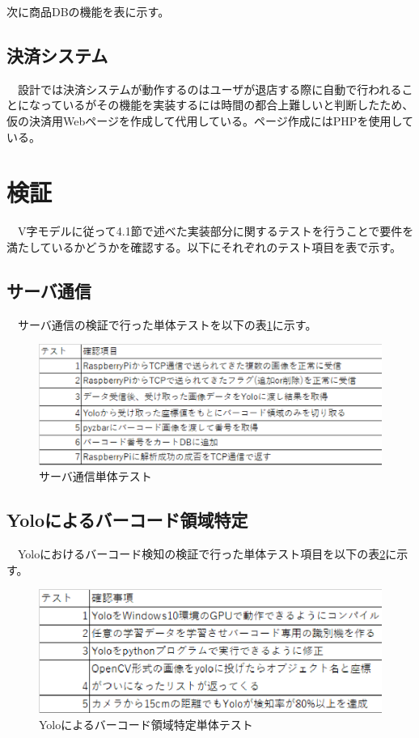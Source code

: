 
次に商品DBの機能を表に示す。


\subsection*{決済システム}
　設計では決済システムが動作するのはユーザが退店する際に自動で行われることになっているがその機能を実装するには時間の都合上難しいと判断したため、仮の決済用Webページを作成して代用している。ページ作成にはPHPを使用している。

\section{検証}
　V字モデルに従って4.1節で述べた実装部分に関するテストを行うことで要件を満たしているかどうかを確認する。以下にそれぞれのテスト項目を表で示す。

\subsection*{サーバ通信}
　サーバ通信の検証で行った単体テストを以下の表\ref{server_test}に示す。
\begin{figure}[htbp]
\centering
\includegraphics[width=12cm]{./pic/server_test.eps}
\caption{サーバ通信単体テスト}
\label{server_test}
\end{figure}

\subsection*{Yoloによるバーコード領域特定}
　Yoloにおけるバーコード検知の検証で行った単体テスト項目を以下の表\ref{yolo_test}に示す。
\begin{figure}[htbp]
\centering
\includegraphics[width=12cm]{./pic/yolo_test.eps}
\caption{Yoloによるバーコード領域特定単体テスト}
\label{yolo_test}
\end{figure}


